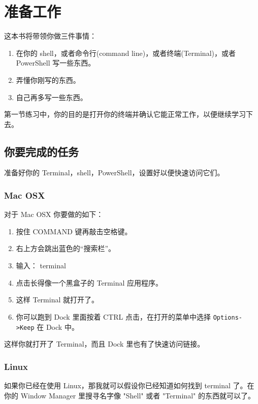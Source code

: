 \chapter{准备工作}

这本书将带领你做三件事情：

\begin{enumerate}
\item 在你的 shell，或者命令行(command line)，或者终端(Terminal)，或者 PowerShell 写一些东西。
\item 弄懂你刚写的东西。
\item 自己再多写一些东西。
\end{enumerate}

第一节练习中，你的目的是打开你的终端并确认它能正常工作，以便继续学习下去。

\section{你要完成的任务}

准备好你的 Terminal，shell，PowerShell，设置好以便快速访问它们。

\subsection{Mac OSX}

对于 Mac OSX 你要做的如下：

\begin{enumerate}
\item 按住 COMMAND 键再敲击空格键。
\item 右上方会跳出蓝色的“搜索栏”。
\item 输入： terminal
\item 点击长得像一个黑盒子的 Terminal 应用程序。
\item 这样 Terminal 就打开了。
\item 你可以跑到 Dock 里面按着 CTRL 点击，在打开的菜单中选择 \verb|Options->Keep| 在 Dock 中。
\end{enumerate}

这样你就打开了 Terminal，而且 Dock 里也有了快速访问链接。

\subsection{Linux}

如果你已经在使用 Linux，那我就可以假设你已经知道如何找到 terminal 了。在你的 Window Manager
里搜寻名字像 "Shell" 或者 "Terminal" 的东西就可以了。

